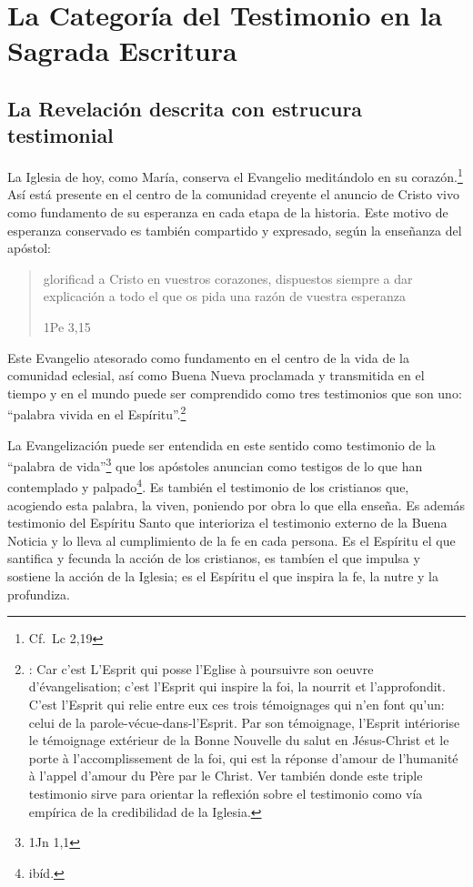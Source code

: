 \section{La Categoría del Testimonio en la Sagrada Escritura}

\subsection{La Revelación descrita con estrucura testimonial}

La Iglesia de hoy, como María, conserva el Evangelio meditándolo en su
corazón.\footnote{Cf.~Lc 2,19} Así está presente en el centro de la comunidad
creyente el anuncio de Cristo vivo como fundamento de su esperanza en cada etapa
de la historia. Este motivo de esperanza conservado es también compartido y
expresado, según la enseñanza del apóstol:
\blockquote[1Pe 3,15]{glorificad a Cristo en vuestros corazones, dispuestos
  siempre a dar explicación a todo el que os pida una razón de vuestra
  esperanza}.

Este Evangelio atesorado como fundamento en el centro de la vida de la comunidad
eclesial, así como Buena Nueva proclamada y transmitida en el tiempo y en el
mundo puede ser comprendido como tres testimonios que son uno: \enquote{palabra
  vivida en el Espíritu}.\footnote{\cite[Cf.~][110]{latourelle1975et}: Car c'est
  L'Esprit qui posse l'Eglise à poursuivre son oeuvre d'évangelisation; c'est
  l'Esprit qui inspire la foi, la nourrit et l'approfondit. C'est l'Esprit qui
  relie entre eux ces trois témoignages qui n'en font qu'un: celui de la
  parole-vécue-dans-l'Esprit. Par son témoignage, l'Esprit intériorise le
  témoignage extérieur de la Bonne Nouvelle du salut en Jésus-Christ et le porte
  à l'accomplissement de la foi, qui est la réponse d'amour de l'humanité à
  l'appel d'amour du Père par le Christ. Ver también \cite[582]{ninot2009tf}
  donde este triple testimonio sirve para orientar la reflexión sobre el
  testimonio como vía empírica de la credibilidad de la Iglesia.}

La Evangelización puede ser entendida en este sentido como testimonio de la
\enquote{palabra de vida}\footnote{1Jn 1,1} que los apóstoles anuncian como
testigos de lo que han contemplado y palpado\footnote{ibíd.}. Es también el
testimonio de los cristianos que, acogiendo esta palabra, la viven, poniendo por
obra lo que ella enseña. Es además testimonio del Espíritu Santo que interioriza
el testimonio externo de la Buena Noticia y lo lleva al cumplimiento de la fe en
cada persona.\autocite[Cf.~][110]{latourelle1975et} Es el Espíritu el que
santifica y fecunda la acción de los cristianos, es tambíen el que impulsa y
sostiene la acción de la Iglesia; es el Espíritu el que inspira la fe, la nutre
y la profundiza.\autocite[Cf.~][110]{latourelle1975et}

